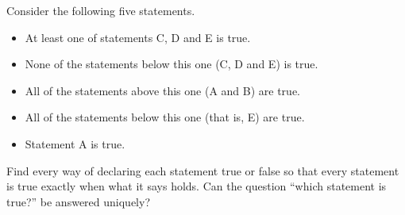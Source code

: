 Consider the following five statements.
\begin{itemize}
\item[(A)] At least one of statements C, D and E is true.
\item[(B)] None of the statements below this one (C, D and E) is true.
\item[(C)] All of the statements above this one (A and B) are true.
\item[(D)] All of the statements below this one (that is, E) are true.
\item[(E)] Statement A is true.
\end{itemize}
Find every way of declaring each statement true or false so that every statement is true exactly when what it says holds. Can the question ``which statement is true?'' be answered uniquely?

